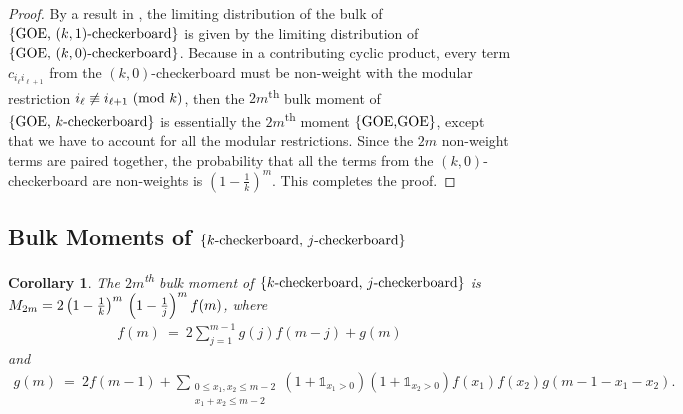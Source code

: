 \documentclass[11pt,reqno]{amsart}
\numberwithin{equation}{section}
\theoremstyle{plain}
\newtheorem{corollary}[thm]{Corollary}
\begin{document}
\begin{proof}
By a result in \cite{Tao1}, the limiting distribution of the bulk of $\{\textup{GOE, }(k,1)\textup{-checkerboard}\}$ is given by the limiting distribution of $\{\textup{GOE, }(k,0)\textup{-checkerboard}\}$. Because in a contributing cyclic product, every term $c_{i_\ell i_{\ell+1}}$ from the $(k, 0)$-checkerboard must be non-weight with the modular restriction $i_\ell\not\equiv i_{\ell+1}\textup{ (mod $k$)}$, then the $2m$\textsuperscript{th} bulk moment of $\{\textup{GOE, }k\textup{-checkerboard}\}$ is essentially the $2m$\textsuperscript{th} moment $\{\textup{GOE,}\\ \textup{GOE}\}$, except that we have to account for all the modular restrictions. Since the $2m$ non-weight terms are paired together, the probability that all the terms from the $(k,0)$-checkerboard are non-weights is $\left(1-\frac{1}{k}\right)^m$. This completes the proof.

\end{proof}

\subsection{Bulk Moments of $\{k\textup{-checkerboard, }j\textup{-checkerboard}\}$}
\begin{corollary} The $2m$\textsuperscript{th} bulk moment of $\{k\textup{-checkerboard, }j\textup{-checkerboard}\}$ is $M_{2m}=2\left(1-\frac{1}{k}\right)^m\\ \left(1-\frac{1}{j}\right)^m f(m)$, where
\begin{align}
f(m) \ = \ 2\sum_{j=1}^{m-1}g(j)f(m-j) + g(m)
\end{align}
and 
\begin{align}
g(m) \ = \ 2f(m-1) + \sum_{\substack{0\leq x_1,x_2\leq m-2\\ x_1+x_2\leq m-2}}(1+\mathbb{1}_{x_1>0})(1+\mathbb{1}_{x_2>0})f(x_1)f(x_2)g(m-1-x_1-x_2).
\end{align}
\end{corollary}
\end{document}
